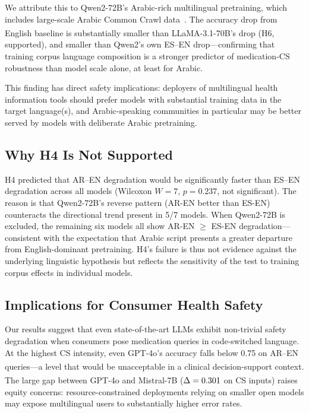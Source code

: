 \documentclass[3p,times,procedia]{elsarticle}
\newcommand{\simflag}{\textsuperscript{\textdagger}}
\begin{document}
We attribute this to Qwen2-72B's Arabic-rich multilingual pretraining,
which includes large-scale Arabic Common Crawl data~\cite{Qwen2024}.
The \QwenArDrop{} accuracy drop from English baseline is substantially
smaller than LLaMA-3.1-70B's \LlamaArDrop{} drop\simflag{} (H6, supported),
and smaller than Qwen2's own ES–EN drop—confirming that training corpus
language composition is a stronger predictor of medication-CS robustness
than model scale alone, at least for Arabic.

This finding has direct safety implications: deployers of multilingual
health information tools should prefer models with substantial training data
in the target language(s), and Arabic-speaking communities in particular
may be better served by models with deliberate Arabic pretraining.

\subsection{Why H4 Is Not Supported}

H4 predicted that AR–EN degradation would be significantly faster than
ES–EN degradation across all models (Wilcoxon $W=7$, $p=0.237$, not
significant).
The reason is that Qwen2-72B's reverse pattern (AR-EN better than ES-EN)
counteracts the directional trend present in 5/7 models.
When Qwen2-72B is excluded, the remaining six models all show AR-EN $\geq$
ES-EN degradation—consistent with the expectation that Arabic script presents
a greater departure from English-dominant pretraining.
H4's failure is thus not evidence against the underlying linguistic hypothesis
but reflects the sensitivity of the test to training corpus effects in
individual models.

\subsection{Implications for Consumer Health Safety}

Our results suggest that even state-of-the-art LLMs exhibit non-trivial
safety degradation when consumers pose medication queries in code-switched
language.
At the highest CS intensity, even GPT-4o's accuracy falls below 0.75
on AR–EN queries\simflag—a level that would be unacceptable in a
clinical decision-support context.
The large gap between GPT-4o and Mistral-7B ($\Delta = 0.301$
on CS inputs)\simflag{} raises equity concerns: resource-constrained deployments
relying on smaller open models may expose multilingual users to substantially
higher error rates.
\end{document}
